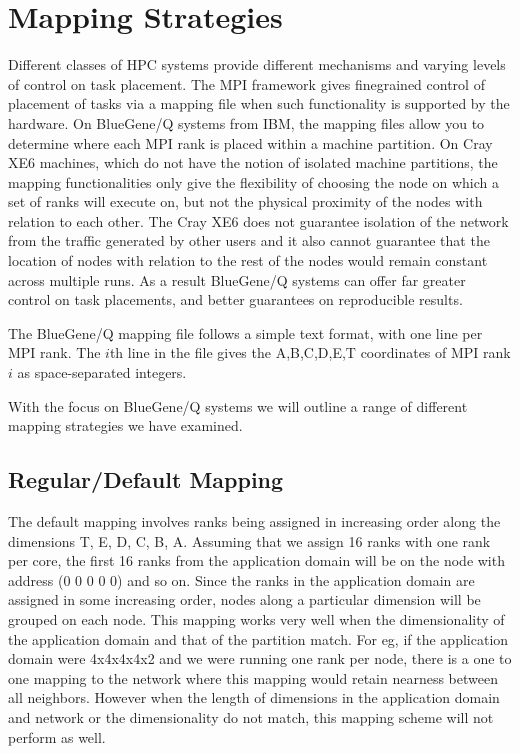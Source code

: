 \documentclass{acm_proc_article-sp}
\begin{document}
\section{Mapping Strategies}\label{sect:mapping}
Different classes of HPC systems provide different mechanisms and varying levels of control on task placement.
The MPI framework gives finegrained control of placement of tasks via a mapping file when such functionality
is supported by the hardware. On BlueGene/Q systems from IBM, the mapping files allow you to determine where
each MPI rank is placed within a machine partition. On Cray XE6 machines, which do not have the notion of
isolated machine partitions, the mapping functionalities only give the flexibility of choosing the node on
which a set of ranks will execute on, but not the physical proximity of the nodes with relation to each other.
The Cray XE6 does not guarantee isolation of the network from the traffic generated by other users and it
also cannot guarantee that the location of nodes with relation to the rest of the nodes would remain constant
across multiple runs. As a result BlueGene/Q systems can offer far greater control on task placements, and
better guarantees on reproducible results.

The BlueGene/Q mapping file follows a simple text format, with one
line per MPI rank.  The $i$th line in the file gives the A,B,C,D,E,T
coordinates of MPI rank $i$ as space-separated integers.

With the focus on BlueGene/Q systems we will outline a range of different mapping strategies we have examined.

\subsection{Regular/Default Mapping}
The default mapping involves ranks being assigned in increasing order along the dimensions T, E, D, C, B, A.
Assuming that we assign 16 ranks with one rank per core, the first 16 ranks from the application domain will
be on the node with address (0 0 0 0 0) and so on. Since the ranks in the application domain are assigned in
some increasing order, nodes along a particular dimension will be grouped on each node. This mapping works
very well when the dimensionality of the application domain and that of the partition match. For eg, if the
application domain were 4x4x4x4x2 and we were running one rank per node, there is a one to one mapping to the
network where this mapping would retain nearness between all neighbors. However when the length of dimensions
in the application domain and network or the dimensionality do not match, this mapping scheme will not perform as well.
\end{document}
